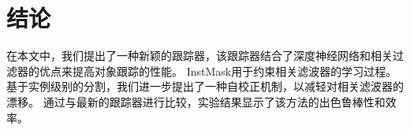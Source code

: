\section{结论}
在本文中，我们提出了一种新颖的跟踪器，该跟踪器结合了深度神经网络和相关过滤器的优点来提高对象跟踪的性能。
InstMask用于约束相关滤波器的学习过程。基于实例级别的分割，我们进一步提出了一种自校正机制，以减轻对相关滤波器的漂移。
通过与最新的跟踪器进行比较，实验结果显示了该方法的出色鲁棒性和效率。